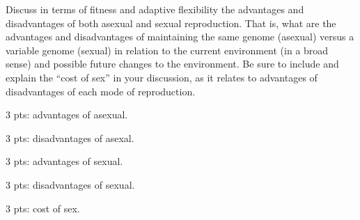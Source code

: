 \documentclass[12pt, addpoints]{exam}
\begin{document}
\begin{questions}
\newpage

\question[20]%
Discuss in terms of fitness and adaptive flexibility the advantages and disadvantages of both asexual and sexual reproduction. That is, what are the advantages and disadvantages of maintaining the same genome (asexual) versus a variable genome (sexual) in relation to the current environment (in a broad sense) and possible future changes to the environment. Be sure to include and explain the ``cost of sex'' in your discussion, as it relates to advantages of disadvantages of each mode of reproduction.
	\begin{solution}
	3 pts: advantages of asexual.
	
	3 pts: disadvantages of asexal. \vspace{\baselineskip}
	
	3 pts: advantages of sexual.
	
	3 pts: disadvantages of sexual.
	
	3 pts: cost of sex.
	\end{solution}

\end{questions}
\end{document}
